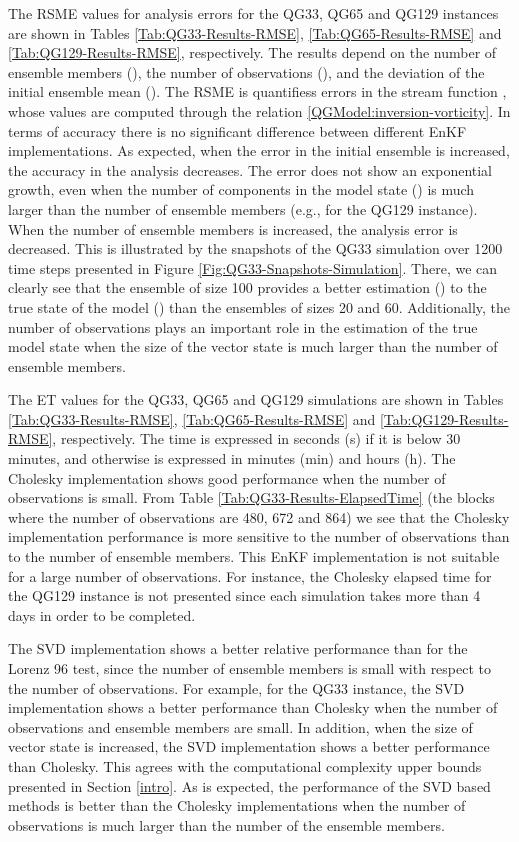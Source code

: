 \documentclass[12pt]{article}
\begin{document}
The RSME values for analysis errors for the QG33, QG65 and QG129 instances are shown in Tables  \ref{Tab:QG33-Results-RMSE}, \ref{Tab:QG65-Results-RMSE} and  \ref{Tab:QG129-Results-RMSE}, respectively. The results depend on the number of ensemble members (), the number of observations (), and the deviation of the initial ensemble mean (). The RSME is quantifiess errors in the stream function , whose values are computed through the relation \eqref{QGModel:inversion-vorticity}.  In terms of accuracy there is no significant difference between different EnKF implementations. As expected, when the error in the initial ensemble is increased, the accuracy in the analysis decreases. The error does not show an exponential growth, even when the number of components in the model state () is much larger than the number of ensemble members (e.g., for the QG129 instance). When the number of ensemble members is increased, the analysis error is decreased. This is illustrated by the snapshots of the QG33 simulation over 1200 time steps presented in Figure  \ref{Fig:QG33-Snapshots-Simulation}. There, we can clearly see that the ensemble of size 100 provides a better estimation () to the true state of the model () than the ensembles of sizes 20 and 60. Additionally, the number of observations plays an important role in the estimation of the true model state when the size of the vector state is much larger than the number of ensemble members. 

The ET values for the QG33, QG65 and QG129 simulations are shown in Tables  \ref{Tab:QG33-Results-RMSE}, \ref{Tab:QG65-Results-RMSE} and  \ref{Tab:QG129-Results-RMSE}, respectively. The time is expressed in seconds (s)
if it is below 30 minutes, and otherwise is expressed
in minutes (min) and hours (h). The Cholesky implementation shows good performance when the number of observations is small. From Table  \ref{Tab:QG33-Results-ElapsedTime} (the blocks where the number of observations are 480, 672 and 864) we see that the Cholesky implementation performance is more sensitive to the number of observations than to the number of ensemble members. 
This EnKF implementation is not suitable for a large number of observations. For instance, the Cholesky elapsed time for the QG129 instance is not presented since each simulation takes more than 4 days in order to be completed. 

The SVD implementation shows a better relative performance than for the Lorenz 96 test, since the number of ensemble members is small with respect to the number of observations. For example, for the QG33 instance, the SVD implementation shows a better performance than Cholesky when the number of observations and ensemble members are small. In addition, when the size of vector state is increased, the SVD implementation shows a better performance than Cholesky. This agrees with the computational complexity upper bounds presented  in Section  \ref{intro}. As is expected, the performance of the SVD based methods is better than the Cholesky implementations when the number of observations is much larger than the number of the ensemble members. 
\end{document}
